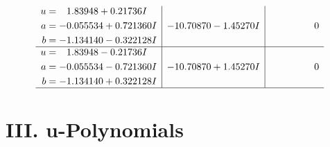 \documentclass[1p]{elsarticle_modified}
\theoremstyle{definition}
\begin{document}
$$\begin{array}{c|c|c}
\begin{aligned}
u &= \phantom{-}1.83948 + 0.21736 I \\
a &= -0.055534 + 0.721360 I \\
b &= -1.134140 - 0.322128 I\end{aligned}
 & -10.70870 - 1.45270 I & \phantom{-0.000000 } 0 \\ \hline\begin{aligned}
u &= \phantom{-}1.83948 - 0.21736 I \\
a &= -0.055534 - 0.721360 I \\
b &= -1.134140 + 0.322128 I\end{aligned}
 & -10.70870 + 1.45270 I & \phantom{-0.000000 } 0\\
 \hline 
 \end{array}$$\newpage
\newpage\renewcommand{\arraystretch}{1}
\centering \section*{ III. u-Polynomials}
\end{document}
